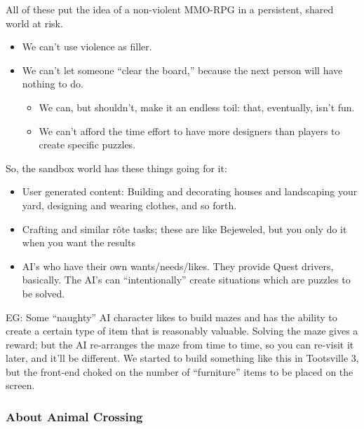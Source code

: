 \documentclass[11pt]{article}
\begin{document}
All of  these put the idea  of a non-violent MMO-RPG  in a persistent,
shared world at risk.

\begin{itemize}
\item We  can't use violence as  filler.

\item We can't let someone “clear the board,” because the next person
will have nothing to do. 

\begin{itemize}
\item We can, but shouldn't, make it an endless toil: that, eventually,
isn't fun.

\item We can't afford the time effort to have more designers than players
to create specific puzzles.
\end{itemize}
\end{itemize}

So, the sandbox world has these things going for it:

\begin{itemize}
\item User generated content: Building and decorating houses and
landscaping your yard, designing and wearing clothes, and so
forth.

\item Crafting and similar rôte tasks; these are like Bejeweled, but you
only do it when you want the results

\item AI's who have their own wants/needs/likes. They provide Quest
drivers, basically. The AI's can “intentionally” create situations
which are puzzles to be solved.
\end{itemize}

EG:  Some “naughty”  AI character  likes to  build mazes  and has  the
ability  to  create  a  certain   type  of  item  that  is  reasonably
valuable. Solving the maze gives a  reward; but the AI re-arranges the
maze from  time to time,  so you can re-visit  it later, and  it'll be
different. We  started to build  something like this in  Tootsville 3,
but the  front-end choked  on the  number of  “furniture” items  to be
placed on the screen.

\subsubsection{About Animal Crossing}
\label{sec-1-1-3}
\end{document}
